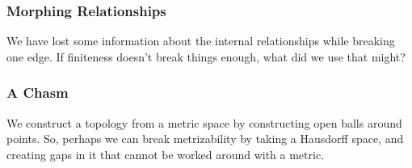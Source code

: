 \begin{frame}
    \frametitle{Morphing Relationships}
    \centering

    \pause

    \begin{center}
        We have lost some information about the internal relationships while
        breaking one edge. \pause If finiteness doesn't break things enough,
        what did we use that might?
    \end{center}

\end{frame}




\begin{frame}
    \frametitle{A Chasm}

    We construct a topology from a metric space by constructing open balls
    around points. \pause So, perhaps we can break metrizability by taking a
    Hausdorff space, and creating gaps in it that cannot be worked around with a
    metric. %

\end{frame}

